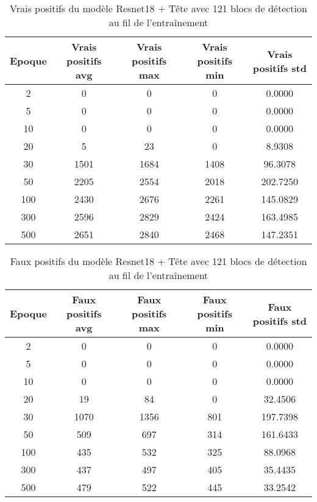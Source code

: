 \begin{table}[!ht]
    \caption{Vrais positifs du modèle Resnet18 + Tête avec 121 blocs de détection au fil de l'entraînement}
    \label{tab:resnet18+head_121n_true_positive}
    \centering
    \begin{tabular}{ |c||c|c|c|c|  }
        \hline
        \rowcolor{gray!50}
        Epoque & Vrais positifs avg & Vrais positifs max & Vrais positifs min & Vrais positifs std\\
        \hline
        2 & 0 & 0 & 0 & 0.0000\\
        5 & 0 & 0 & 0 & 0.0000\\
        10 & 0 & 0 & 0 & 0.0000\\
        20 & 5 & 23 & 0 & 8.9308\\
        30 & 1501 & 1684 & 1408 & 96.3078\\
        50 & 2205 & 2554 & 2018 & 202.7250\\
        100 & 2430 & 2676 & 2261 & 145.0829\\
        300 & 2596 & 2829 & 2424 & 163.4985\\
        500 & 2651 & 2840 & 2468 & 147.2351\\
        \hline
    \end{tabular}
\end{table}

\begin{table}[!ht]
    \caption{Faux positifs du modèle Resnet18 + Tête avec 121 blocs de détection au fil de l'entraînement}
    \label{tab:resnet18+head_121n_false_positive}
    \centering
    \begin{tabular}{ |c||c|c|c|c|  }
        \hline
        \rowcolor{gray!50}
        Epoque & Faux positifs avg & Faux positifs max & Faux positifs min & Faux positifs std\\
        \hline
        2 & 0 & 0 & 0 & 0.0000\\
        5 & 0 & 0 & 0 & 0.0000\\
        10 & 0 & 0 & 0 & 0.0000\\
        20 & 19 & 84 & 0 & 32.4506\\
        30 & 1070 & 1356 & 801 & 197.7398\\
        50 & 509 & 697 & 314 & 161.6433\\
        100 & 435 & 532 & 325 & 88.0968\\
        300 & 437 & 497 & 405 & 35.4435\\
        500 & 479 & 522 & 445 & 33.2542\\
        \hline
    \end{tabular}
\end{table}

